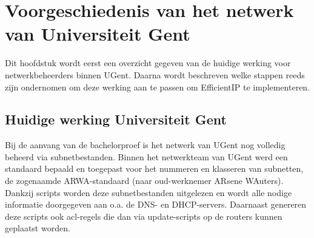 
\chapter{Voorgeschiedenis van het netwerk van Universiteit Gent}%
\label{ch:voorgeschiedenis}
Dit hoofdstuk wordt eerst een overzicht gegeven van de huidige werking voor netwerkbeheerders binnen UGent.
Daarna wordt beschreven welke stappen reeds zijn ondernomen om deze werking aan te passen om EfficientIP te implementeren.

\section{Huidige werking Universiteit Gent}
Bij de aanvang van de bachelorproef is het netwerk van UGent nog volledig beheerd via subnetbestanden. Binnen het netwerkteam van UGent werd een standaard bepaald en toegepast voor het nummeren en klasseren van subnetten, de zogenaamde ARWA-standaard (naar oud-werknemer ARsene WAuters). Dankzij scripts worden deze subnetbestanden uitgelezen en wordt alle nodige informatie doorgegeven aan o.a. de DNS- en DHCP-servers. Daarnaast genereren deze scripts ook \acrfull{acl}-regels die dan via update-scripts op de routers kunnen geplaatst worden.

